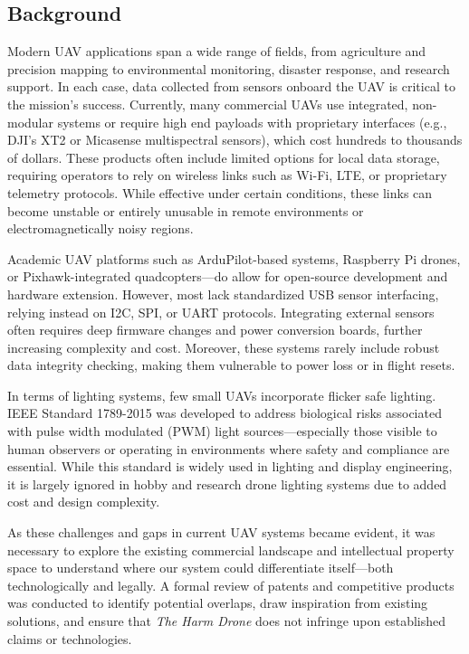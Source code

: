\documentclass[12pt]{article}
\begin{document}
\subsection{Background}

\par Modern UAV applications span a wide range of fields, from agriculture and precision mapping to environmental monitoring, disaster response, and research support. In each case, data collected from sensors onboard the UAV is critical to the mission's success. Currently, many commercial UAVs use integrated, non-modular systems or require high end payloads with proprietary interfaces (e.g., DJI’s XT2 or Micasense multispectral sensors), which cost hundreds to thousands of dollars. These products often include limited options for local data storage, requiring operators to rely on wireless links such as Wi-Fi, LTE, or proprietary telemetry protocols. While effective under certain conditions, these links can become unstable or entirely unusable in remote environments or electromagnetically noisy regions.

\par Academic UAV platforms such as ArduPilot-based systems, Raspberry Pi drones, or Pixhawk-integrated quadcopters—do allow for open-source development and hardware extension. However, most lack standardized USB sensor interfacing, relying instead on I2C, SPI, or UART protocols. Integrating external sensors often requires deep firmware changes and power conversion boards, further increasing complexity and cost. Moreover, these systems rarely include robust data integrity checking, making them vulnerable to power loss or in flight resets.

\par In terms of lighting systems, few small UAVs incorporate flicker safe lighting. IEEE Standard 1789-2015 was developed to address biological risks associated with pulse width modulated (PWM) light sources—especially those visible to human observers or operating in environments where safety and compliance are essential. While this standard is widely used in lighting and display engineering, it is largely ignored in hobby and research drone lighting systems due to added cost and design complexity.
\par As these challenges and gaps in current UAV systems became evident, it was necessary to explore the existing commercial landscape and intellectual property space to understand where our system could differentiate itself—both technologically and legally. A formal review of patents and competitive products was conducted to identify potential overlaps, draw inspiration from existing solutions, and ensure that \textit{The Harm Drone} does not infringe upon established claims or technologies.
\end{document}
